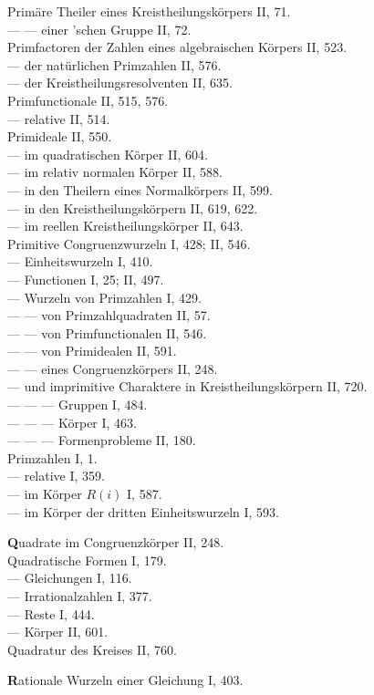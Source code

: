 Primäre Theiler eines Kreistheilungskörpers II, 71.\\
--- --- einer 'schen Gruppe II, 72.\\
Primfactoren der Zahlen eines algebraischen Körpers II, 523.\\
--- der natürlichen Primzahlen II, 576.\\
--- der Kreistheilungsresolventen II, 635.\\
Primfunctionale II, 515, 576.\\
--- relative II, 514.\\
Primideale II, 550.\\
--- im quadratischen Körper II, 604.\\
--- im relativ normalen Körper II, 588.\\
--- in den Theilern eines Normalkörpers II, 599.\\
--- in den Kreistheilungskörpern II, 619, 622.\\
--- im reellen Kreistheilungskörper II, 643.\\
Primitive Congruenzwurzeln I, 428; II, 546.\\
--- Einheitswurzeln I, 410.\\
--- Functionen I, 25; II, 497.\\
--- Wurzeln von Primzahlen I, 429.\\
--- --- von Primzahlquadraten II, 57.\\
--- --- von Primfunctionalen II, 546.\\
--- --- von Primidealen II, 591.\\
--- --- eines Congruenzkörpers II, 248.\\
--- und imprimitive Charaktere in Kreistheilungskörpern II, 720.\\
--- --- --- Gruppen I, 484.\\
--- --- --- Körper I, 463.\\
--- --- --- Formenprobleme II, 180.\\
Primzahlen I, 1.\\
--- relative I, 359.\\
--- im Körper $R(i)$ I, 587.\\
--- im Körper der dritten Einheitswurzeln I, 593.

\medskip
\noindent
\textbf{Q}uadrate im Congruenzkörper II, 248.\\
Quadratische Formen I, 179.\\
--- Gleichungen I, 116.\\
--- Irrationalzahlen I, 377.\\
--- Reste I, 444.\\
--- Körper II, 601.\\
Quadratur des Kreises II, 760.

\medskip
\noindent
\textbf{R}ationale Wurzeln einer Gleichung I, 403.
